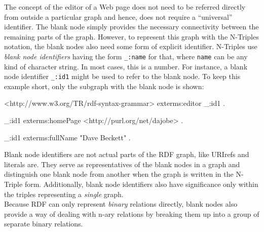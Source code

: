 \documentclass[11pt,a4paper,headsepline, bibtotoc]{scrreprt}
\begin{document}
The concept of the editor of a Web page does not need to be referred directly from outside a particular graph and hence, does not require a ``universal'' identifier. The blank node simply provides the necessary connectivity between the remaining parts of the graph. However, to represent this graph with the N-Triples notation, the blank nodes also need some form of explicit identifier. N-Triples use \textit{blank node identifiers} having the form \texttt{\_:name} for that, where \texttt{name} can be any kind of character string. In most cases, this is a number. For instance, a blank node identifier \texttt{\_:id1} might be used to refer to the blank node. To keep this example short, only the subgraph with the blank node is shown:
\begin{blank}[caption=Triples with Blank Nodes]
<http://www.w3.org/TR/rdf-syntax-grammar>   exterms:editor   _:id1 .

_:id1   exterms:homePage    <http://purl.org/net/dajobe> .

_:id1   exterms:fullName    "Dave Beckett" .
\end{blank} 
Blank node identifiers are not actual parts of the RDF graph, like URIrefs and literals are. They serve as representatives of the blank nodes in a graph and distinguish one blank node from another when the graph is written in the N-Triple form. Additionally, blank node identifiers also have significance only within the triples representing a \textit{single} graph.\\
Because RDF can only represent \textit{binary} relations directly, blank nodes also provide a way of dealing with n-ary relations by breaking them up into a group of separate binary relations.
\end{document}
